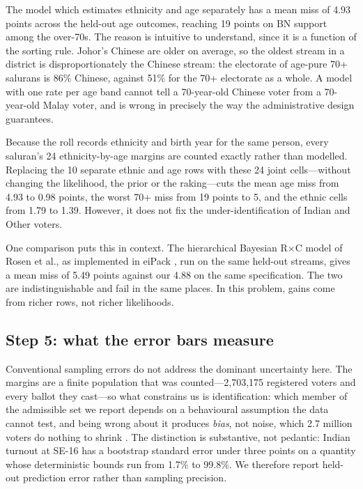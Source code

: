 \documentclass[11pt]{article}
\begin{document}
The model which estimates ethnicity and age separately has a mean miss of 4.93 points across the held-out age outcomes, reaching 19 points on BN support among the over-70s. The reason is intuitive to understand, since it is a function of the sorting rule. Johor's Chinese are older on average, so the oldest stream in a district is disproportionately the Chinese stream: the electorate of age-pure 70+ salurans is 86\% Chinese, against 51\% for the 70+ electorate as a whole. A model with one rate per age band cannot tell a 70-year-old Chinese voter from a 70-year-old Malay voter, and is wrong in precisely the way the administrative design guarantees.

Because the roll records ethnicity and birth year for the same person, every saluran's 24 ethnicity-by-age margins are counted exactly rather than modelled. Replacing the 10 separate ethnic and age rows with these 24 joint cells---without changing the likelihood, the prior or the raking---cuts the mean age miss from 4.93 to 0.98 points, the worst 70+ miss from 19 points to 5, and the ethnic cells from 1.79 to 1.39. However, it does not fix the under-identification of Indian and Other voters.

One comparison puts this in context. The hierarchical Bayesian R$\times$C model of Rosen et al.\cite{rosen2001}, as implemented in eiPack \cite{eipack2007}, run on the same held-out streams, gives a mean miss of 5.49 points against our 4.88 on the same specification. The two are indistinguishable and fail in the same places. In this problem, gains come from richer rows, not richer likelihoods.

\subsection{Step 5: what the error bars measure}
\label{sec:strategy-errors}

Conventional sampling errors do not address the dominant uncertainty here. The margins are a finite population that was counted---2,703,175 registered voters and every ballot they cast---so what constrains us is identification: which member of the admissible set we report depends on a behavioural assumption the data cannot test, and being wrong about it produces \emph{bias}, not noise, which 2.7 million voters do nothing to shrink \cite{manski1995}. The distinction is substantive, not pedantic: Indian turnout at SE-16 has a bootstrap standard error under three points on a quantity whose deterministic bounds run from 1.7\% to 99.8\%. We therefore report held-out prediction error rather than sampling precision.
\end{document}

